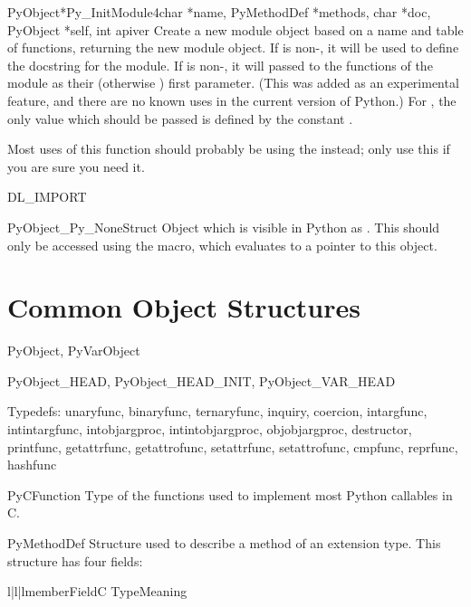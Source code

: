 \documentclass{manual}
\begin{document}
\begin{cfuncdesc}{PyObject*}{Py_InitModule4}{char *name,
                                             PyMethodDef *methods,
                                             char *doc, PyObject *self,
                                             int apiver}
  Create a new module object based on a name and table of functions,
  returning the new module object.  If  is non-\NULL, it will
  be used to define the docstring for the module.  If  is
  non-\NULL, it will passed to the functions of the module as their
  (otherwise \NULL) first parameter.  (This was added as an
  experimental feature, and there are no known uses in the current
  version of Python.)  For , the only value which should
  be passed is defined by the constant .

    Most uses of this function should probably be using
  the  instead; only use this if you are
  sure you need it.
\end{cfuncdesc}

DL_IMPORT

\begin{cvardesc}{PyObject}{_Py_NoneStruct}
  Object which is visible in Python as .  This should only
  be accessed using the  macro, which evaluates to a
  pointer to this object.
\end{cvardesc}


\section{Common Object Structures \label{common-structs}}

PyObject, PyVarObject

PyObject_HEAD, PyObject_HEAD_INIT, PyObject_VAR_HEAD

Typedefs:
unaryfunc, binaryfunc, ternaryfunc, inquiry, coercion, intargfunc,
intintargfunc, intobjargproc, intintobjargproc, objobjargproc,
destructor, printfunc, getattrfunc, getattrofunc, setattrfunc,
setattrofunc, cmpfunc, reprfunc, hashfunc

\begin{ctypedesc}{PyCFunction}
Type of the functions used to implement most Python callables in C.
\end{ctypedesc}

\begin{ctypedesc}{PyMethodDef}
Structure used to describe a method of an extension type.  This
structure has four fields:

\begin{tableiii}{l|l|l}{member}{Field}{C Type}{Meaning}
\end{tableiii}
\end{ctypedesc}
\end{document}
